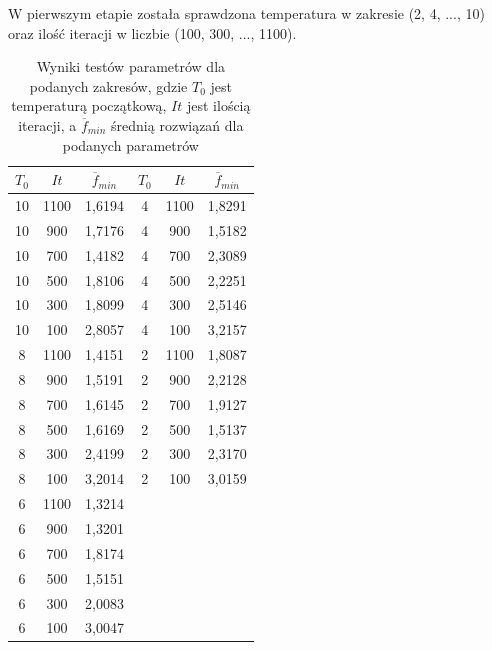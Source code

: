 \documentclass[twoside]{projektInzynierskiMS1}
\newcommand{\si}{ś}
\begin{document}
W pierwszym etapie została sprawdzona temperatura w zakresie (2, 4, ..., 10) oraz ilo\si ć iteracji w liczbie (100, 300, ..., 1100). \\
\begin{table}[htbp]\centering
\def\sym#1{\ifmmode^{#1}\else\(^{#1}\)\fi}
\caption{Wyniki testów parametrów dla podanych zakresów, gdzie $T_0$ jest temperaturą początkową, $It$ jest ilo\si cią iteracji, a $\overline{f}_{min}$ \si rednią rozwiązań dla podanych parametrów}
\renewcommand\arraystretch{1.333}
\begin{tabular}{|c|c|c||c|c|c|} 
                  \hline
                  $T_0$
                  & $It$
                  & $\overline{f}_{min}$ 
& $T_0$
 & $It$
 & $\overline{f}_{min}$ \\ \hline

10 & 1100 & 1,6194 &4 & 1100 & 1,8291 \\ \hline
10 & 900 & 1,7176 &4 & 900 & 1,5182 \\ \hline
10 & 700 & 1,4182&4 & 700 & 2,3089 \\ \hline
10 & 500 & 1,8106&4 & 500 & 2,2251 \\ \hline
10 & 300 & 1,8099 &4 & 300 & 2,5146 \\ \hline 
10 & 100 & 2,8057&4 & 100 & 3,2157 \\ \Xhline{3\arrayrulewidth}

8 & 1100 & 1,4151 &2 & 1100 & 1,8087 \\ \hline 
8 & 900 & 1,5191 &2 & 900 & 2,2128 \\ \hline 
8 & 700 & 1,6145 &2 & 700 & 1,9127 \\ \hline
8 & 500 & 1,6169 &2 & 500 & 1,5137 \\ \hline 
8 & 300 & 2,4199 &2 & 300 & 2,3170 \\ \hline 
8 & 100 & 3,2014 &2 & 100 & 3,0159 \\ \Xhline{3\arrayrulewidth}

6 & 1100 & 1,3214 \\ \hline 
6 & 900 & 1,3201 \\ \hline 
6 & 700 & 1,8174 \\ \hline 
6 & 500 & 1,5151 \\ \hline 
6 & 300 & 2,0083 \\ \hline 
6 & 100 & 3,0047 \\ \hline 
\end{tabular}
\end{table}
\end{document}
